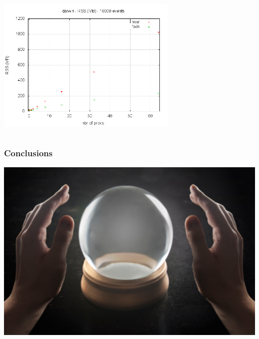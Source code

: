 \documentclass[9pt]{beamer}
\begin{document}
{\begin{columns}
\begin{column}{0.5\textwidth}
\begin{center}
  \end{center}
  \begin{center}
    \includegraphics[width=0.65\textwidth]{figs/darwin-rss.png}
  \end{center}
  \end{column}
  \end{columns}
    
}

\begin{frame}
\frametitle{Conclusions}
\begin{center}
\includegraphics[width=0.975\linewidth]{figs/crystal-ball.jpg}
\end{center}
\end{frame}
\end{document}
